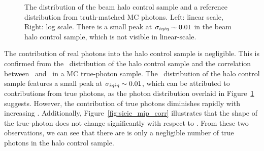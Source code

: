 \begin{figure}[htbp]
  \centering
  \caption{
    The \sieie distribution of the beam halo control sample and a reference distribution from truth-matched MC photons. 
    Left: linear scale, Right: log scale. 
    There is a small peak at $\sigma_{i\eta i\eta} \sim 0.01$ in the beam halo control sample, which is not visible in linear-scale.
  }
  \label{fig:halo_sieie}
\end{figure}

The contribution of real photons into the halo control sample is negligible.
This is confirmed from the \sieie\ distribution of the halo control sample and the correlation between \sieie\ and \emip\ in a MC true-photon sample.
The \sieie\ distribution of the halo control sample features a small peak at $\sigma_{i\eta i\eta} \sim 0.01$, which can be attributed to contributions from true photons, as the photon \sieie distribution overlaid in Figure~\ref{fig:halo_sieie} suggests. 
However, the contribution of true photons diminishes rapidly with increasing \sieie. 
Additionally, Figure~\ref{fig:sieie_mip_corr} illustrates that the shape of the true-photon \sieie does not change significantly with respect to \emip. 
From these two observations, we can see that there are is only a negligible number of true photons in the halo control sample.

